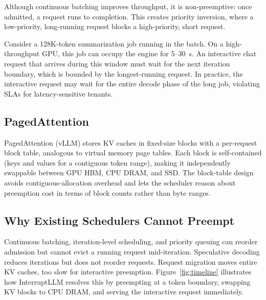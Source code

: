 \documentclass[conference]{IEEEtran}
\begin{document}
Although continuous batching improves throughput, it is non-preemptive: once admitted, a request runs to completion. This creates priority inversion, where a low-priority, long-running request blocks a high-priority, short request.

Consider a 128K-token summarization job running in the batch. On a high-throughput GPU, this job can occupy the engine for 5--30~s. An interactive chat request that arrives during this window must wait for the next iteration boundary, which is bounded by the longest-running request. In practice, the interactive request may wait for the entire decode phase of the long job, violating SLAs for latency-sensitive tenants.

\subsection{PagedAttention}

PagedAttention (vLLM) stores KV caches in fixed-size blocks with a per-request block table, analogous to virtual memory page tables. Each block is self-contained (keys and values for a contiguous token range), making it independently swappable between GPU HBM, CPU DRAM, and SSD. The block-table design avoids contiguous-allocation overhead and lets the scheduler reason about preemption cost in terms of block counts rather than byte ranges.

\subsection{Why Existing Schedulers Cannot Preempt}

Continuous batching, iteration-level scheduling, and priority queuing can reorder admission but cannot evict a running request mid-iteration. Speculative decoding reduces iterations but does not reorder requests. Request migration moves entire KV caches, too slow for interactive preemption. Figure~\ref{fig:timeline} illustrates how InterruptLLM resolves this by preempting at a token boundary, swapping KV blocks to CPU DRAM, and serving the interactive request immediately.
\end{document}
